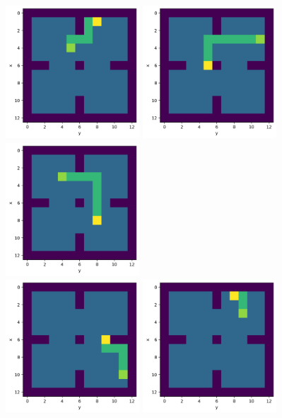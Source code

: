 \documentclass[12pt]{article}
\begin{document}
\includegraphics[height= 5cm, width=5cm]{p3-2-0}
\includegraphics[height= 5cm, width=5cm]{p3-2-1}
\includegraphics[height= 5cm, width=5cm]{p3-2-2} 
\\
\includegraphics[height= 5cm, width=5cm]{p3-2-3}
\includegraphics[height= 5cm, width=5cm]{p3-2-4}
\end{document}
